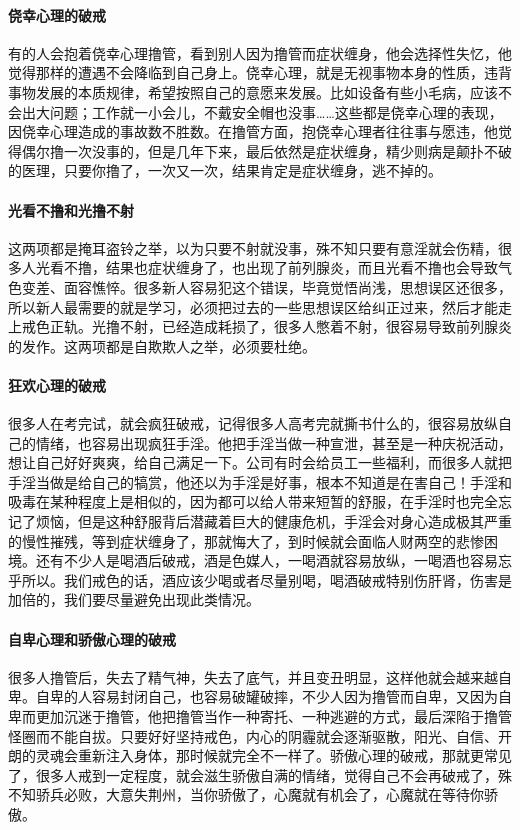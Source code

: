 \paragraph{侥幸心理的破戒} 有的人会抱着侥幸心理撸管，看到别人因为撸管而症状缠身，他会选择性失忆，他觉得那样的遭遇不会降临到自己身上。侥幸心理，就是无视事物本身的性质，违背事物发展的本质规律，希望按照自己的意愿来发展。比如设备有些小毛病，应该不会出大问题；工作就一小会儿，不戴安全帽也没事……这些都是侥幸心理的表现，因侥幸心理造成的事故数不胜数。在撸管方面，抱侥幸心理者往往事与愿违，他觉得偶尔撸一次没事的，但是几年下来，最后依然是症状缠身，精少则病是颠扑不破的医理，只要你撸了，一次又一次，结果肯定是症状缠身，逃不掉的。

\paragraph{光看不撸和光撸不射} 这两项都是掩耳盗铃之举，以为只要不射就没事，殊不知只要有意淫就会伤精，很多人光看不撸，结果也症状缠身了，也出现了前列腺炎，而且光看不撸也会导致气色变差、面容憔悴。很多新人容易犯这个错误，毕竟觉悟尚浅，思想误区还很多，所以新人最需要的就是学习，必须把过去的一些思想误区给纠正过来，然后才能走上戒色正轨。光撸不射，已经造成耗损了，很多人憋着不射，很容易导致前列腺炎的发作。这两项都是自欺欺人之举，必须要杜绝。

\paragraph{狂欢心理的破戒} 很多人在考完试，就会疯狂破戒，记得很多人高考完就撕书什么的，很容易放纵自己的情绪，也容易出现疯狂手淫。他把手淫当做一种宣泄，甚至是一种庆祝活动，想让自己好好爽爽，给自己满足一下。公司有时会给员工一些福利，而很多人就把手淫当做是给自己的犒赏，他还以为手淫是好事，根本不知道是在害自己！手淫和吸毒在某种程度上是相似的，因为都可以给人带来短暂的舒服，在手淫时也完全忘记了烦恼，但是这种舒服背后潜藏着巨大的健康危机，手淫会对身心造成极其严重的慢性摧残，等到症状缠身了，那就悔大了，到时候就会面临人财两空的悲惨困境。还有不少人是喝酒后破戒，酒是色媒人，一喝酒就容易放纵，一喝酒也容易忘乎所以。我们戒色的话，酒应该少喝或者尽量别喝，喝酒破戒特别伤肝肾，伤害是加倍的，我们要尽量避免出现此类情况。

\paragraph{自卑心理和骄傲心理的破戒} 很多人撸管后，失去了精气神，失去了底气，并且变丑明显，这样他就会越来越自卑。自卑的人容易封闭自己，也容易破罐破摔，不少人因为撸管而自卑，又因为自卑而更加沉迷于撸管，他把撸管当作一种寄托、一种逃避的方式，最后深陷于撸管怪圈而不能自拔。只要好好坚持戒色，内心的阴霾就会逐渐驱散，阳光、自信、开朗的灵魂会重新注入身体，那时候就完全不一样了。骄傲心理的破戒，那就更常见了，很多人戒到一定程度，就会滋生骄傲自满的情绪，觉得自己不会再破戒了，殊不知骄兵必败，大意失荆州，当你骄傲了，心魔就有机会了，心魔就在等待你骄傲。

